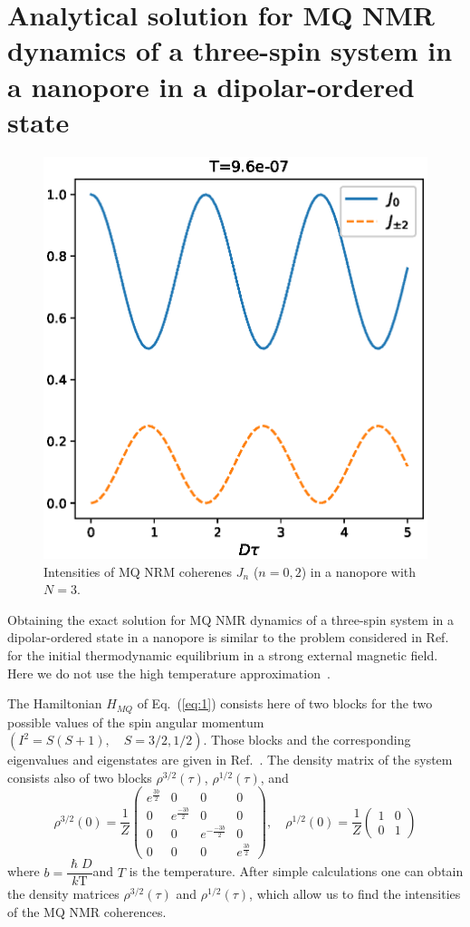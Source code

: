 \documentclass[review]{elsarticle}
\begin{document}
\section{Analytical solution for MQ NMR dynamics of a three-spin system in a nanopore in a dipolar-ordered state}
\label{sec:3}

\begin{figure}
    \centering
  	\includegraphics[width=0.5\linewidth]{coherences_n3_beta5.eps}
	\caption{
	    Intensities of MQ NRM coherenes $J_{n}$ ($n=0, 2$) in a nanopore with $N=3$.
	}
	\label{fig:1}
\end{figure}

Obtaining the exact solution for MQ NMR dynamics of a three-spin system in a dipolar-ordered state in a nanopore is similar to the problem considered in Ref.~\cite{Doronin_2019} for the initial thermodynamic equilibrium in a strong external magnetic field. 
Here we do not use the high temperature approximation~\cite{Goldman_1970}.

The Hamiltonian $H_{MQ}$ of Eq.~(\ref{eq:1}) consists here of two blocks for the two possible values of the spin angular momentum $(I^2 = S(S+1),  \quad S=3/2,1/2)$.
Those blocks and the corresponding eigenvalues and eigenstates are given in Ref.~\cite{Doronin_2019}.
The density matrix of the system consists also of two blocks $\rho^{3/2}(\tau)$, $\rho^{1/2}(\tau)$, and 
%
\begin{equation}
    \label{eq:15} 
    \rho^{3/2}(0) = \dfrac 1 Z
    \begin{pmatrix}
        e^{\frac{3b}{2}} & 0 & 0 & 0 
        \\
        0 & e^{\frac{-3b}{2}} & 0 & 0 
        \\
        0 & 0 & e^{-\frac{-3b}{2}} & 0 
        \\
        0 & 0 & 0 & e^{\frac{3b}{2}}
    \end{pmatrix}, 
    \quad
    \rho^{1/2}(0) = \dfrac 1 Z
    \begin{pmatrix}
       	1 & 0 
        \\
        0 & 1
    \end{pmatrix}
\end{equation}
%
where $b = \dfrac{\hslash D}{k\mathrm{T}}$and $T$ is the temperature.
After simple calculations one can obtain the density matrices $\rho^{3/2}(\tau)$ and $\rho^{1/2}(\tau)$, 
which allow us to find the intensities of the MQ NMR coherences.
\end{document}
